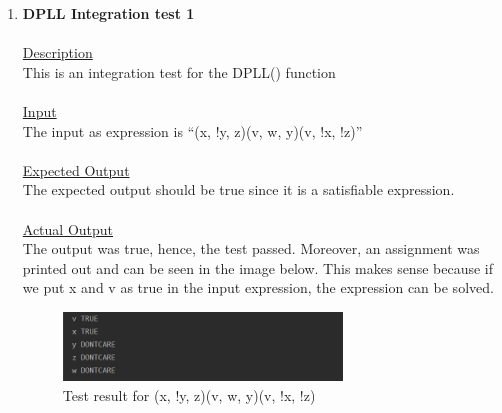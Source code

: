 \documentclass{article}
\newcommand{\quotes}[1]{``#1''}
\begin{document}
	\begin{enumerate}
	\item \textbf{DPLL Integration test 1}\\\\
		\underline{Description}\\
		\indent This is an integration test for the DPLL() function\\\\
		\underline{Input}\\
		\indent The input as expression is \quotes{(x, !y, z)(v, w, y)(v, !x, !z)}\\	\\
		\underline{Expected Output}\\
		\indent The expected output should be true since it is a satisfiable expression.\\\\
		\underline{Actual Output}\\
		The output was true, hence, the test passed. Moreover, an assignment was printed out and can be seen in the image below. This makes sense because if we put x and v as true in the input expression, the expression can be solved. 
			\begin{figure}[H]
					\centering
			 			\includegraphics[width=0.7\textwidth]{dplltest1.png}
			 			\centering
			  			\caption{Test result for (x, !y, z)(v, w, y)(v, !x, !z)}
			  			\label{fig:dplltest1}
					\end{figure}
					

\end{enumerate}
\end{document}
